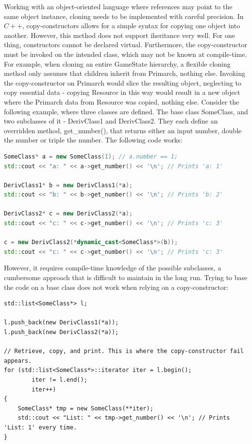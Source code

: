Working with an object-oriented language where references may point to the same object instance, cloning needs to be implemented with careful precision. In $C++$, copy-constructors allows for a simple syntax for copying one object into another. However, this method does not support iheritance very well. For one thing, constructors cannot be declared virtual. Furthermore, the copy-constructor must be invoked on the intended class, which may not be known at compile-time. For example, when cloning an entire GameState hierarchy, a flexible cloning method only assumes that children inherit from Primarch, nothing else. Invoking the copy-constructor on Primarch would slice the resulting object, neglecting to copy essential data - copying Resource in this way would result in a new object where the Primarch data from Resource was copied, nothing else. Consider the following example, where three classes are defined. The base class SomeClass, and two subclasses of it - DerivClass1 and DerivClass2. They each define an overridden method, get\_number(), that returns either an input number, double the number or triple the number. The following code works:

\begin{lstlisting}[language=C++]
SomeClass* a = new SomeClass(1); // a.number == 1;
std::cout << "a: " << a->get_number() << '\n'; // Prints 'a: 1'

DerivClass1* b = new DerivClass1(*a);
std::cout << "b: " << b->get_number() << '\n'; // Prints 'b: 2'

DerivClass2* c = new DerivClass2(*a);
std::cout << "c: " << c->get_number() << '\n'; // Prints 'c: 3'

c = new DerivClass2(*dynamic_cast<SomeClass*>(b));
std::cout << "c: " << c->get_number() << '\n'; // Prints 'c: 3'
\end{lstlisting}

However, it requires compile-time knowledge of the possible subclasses, a cumbersome approach that is difficult to maintain in the long run. Trying to base the code on a base class does not work when relying on a copy-constructor:

\begin{lstlisting}
std::list<SomeClass*> l;

l.push_back(new DerivClass1(*a));
l.push_back(new DerivClass2(*a));
    
// Retrieve, copy, and print. This is where the copy-constructor fail appears.
for (std::list<SomeClass*>::iterator iter = l.begin();
        iter != l.end();
        iter++)
{
    SomeClass* tmp = new SomeClass(**iter);
    std::cout << "List: " << tmp->get_number() << '\n'; // Prints 'List: 1' every time.
}
\end{lstlisting}

